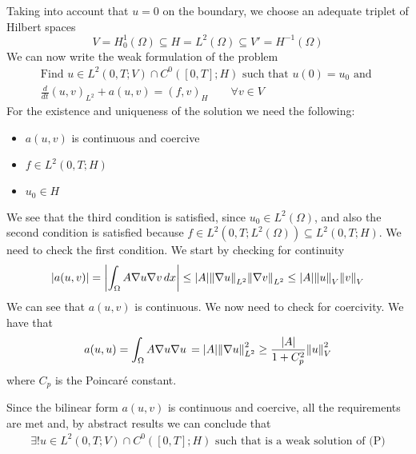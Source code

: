 Taking into account that \(u = 0\) on the boundary, we choose an adequate triplet of Hilbert spaces
\[
    V = H^1_0(\Omega) \subseteq H = L^2(\Omega) \subseteq V' = H^{-1}(\Omega)
\]
We can now write the weak formulation of the problem
\[
    \begin{split}
        \text{Find } u \in L^2(0, T; V) \cap C^0([0, T]; H) \text{ such that } u(0) = u_0 \text{ and } \\
        \frac{d}{dt} (u, v)_{L^2} + a(u, v) = (f, v)_{H} \qquad \forall v \in V
    \end{split}
\]
For the existence and uniqueness of the solution we need the following:
\begin{itemize}
    \item \(a(u, v)\) is continuous and coercive
    \item \(f \in L^2(0, T; H)\)
    \item \(u_0 \in H\)
\end{itemize}
We see that the third condition is satisfied, since \(u_0 \in L^2(\Omega)\), and also the second condition is satisfied because \(f \in L^2(0, T; L^2(\Omega)) \subseteq L^2(0, T; H)\). We need to check the first condition. We start by checking for continuity
\[
    \begin{split}
        \abs{a(u, v)} = \abs{\int_\Omega A \nabla u \nabla v \, dx} \leq \abs{A} \norm{\nabla u}_{L^2} \norm{\nabla v}_{L^2} \leq \abs{A} \norm{u}_{V} \norm{v}_{V}
    \end{split}
\]
We can see that \(a(u, v)\) is continuous. We now need to check for coercivity.
We have that
\[
    \begin{split}
        a(u, u) = \int_\Omega A \nabla u \nabla u \, = \abs{A} \norm{\nabla u}_{L^2}^2 \geq \frac{\abs{A}}{1 + C_p^2} \norm{u}_{V}^2
    \end{split}
\]
where \(C_p\) is the Poincaré constant.

Since the bilinear form \(a(u, v)\) is continuous and coercive, all the
requirements are met and, by abstract results we can conclude that
\[
    \begin{split}
        \exists! u \in L^2(0, T; V) \cap C^0([0, T]; H) \text{ such that is a weak solution of (P)}
    \end{split}
\]

